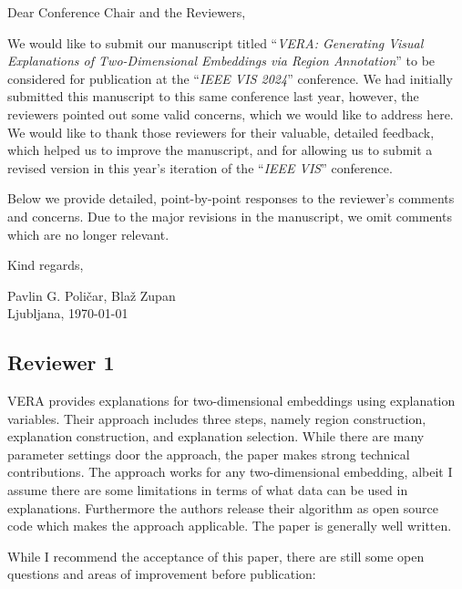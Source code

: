 \documentclass{article}
\newcommand{\review}[1]{\begin{leftbar}\noindent #1\end{leftbar}}
\newlength{\leftbarwidth}
\newlength{\leftbarsep}
\renewenvironment{leftbar}{%
    \def\FrameCommand{{\color{black}{\vrule width \leftbarwidth\relax\hspace {\leftbarsep}}}}%
    \MakeFramed {\advance \hsize -\width \FrameRestore }%
}{\endMakeFramed}
\begin{document}

\vspace{5mm}

\vspace{5mm}


\noindent Dear Conference Chair and the Reviewers, \\
 
\vspace{3mm}

\noindent We would like to submit our manuscript titled ``\textit{VERA: Generating Visual Explanations of Two-Dimensional Embeddings via Region Annotation}'' to be considered for publication at the ``\textit{IEEE VIS 2024}'' conference.
We had initially submitted this manuscript to this same conference last year, however, the reviewers pointed out some valid concerns, which we would like to address here. We would like to thank those reviewers for their valuable, detailed feedback, which helped us to improve the manuscript, and for allowing us to submit a revised version in this year's iteration of the ``\textit{IEEE VIS}'' conference.

Below we provide detailed, point-by-point responses to the reviewer's comments and concerns. Due to the major revisions in the manuscript, we omit comments which are no longer relevant.

\vspace{3mm}

\noindent Kind regards,
\vspace{3mm}

\noindent Pavlin G. Poli\v{c}ar,
Bla\v{z} Zupan \\ 
\noindent Ljubljana, \today

\vspace{10mm}


\subsection*{Reviewer 1}

\review{VERA provides explanations for two-dimensional embeddings using explanation
variables. Their approach includes three steps, namely region construction,
explanation construction, and explanation selection. While there are many
parameter settings door the approach, the paper makes strong technical
contributions. The approach works for any two-dimensional embedding, albeit I
assume there are some limitations in terms of what data can be used in
explanations. Furthermore the authors release their algorithm as open source code
which makes the approach applicable. The paper is generally well written.

While I recommend the acceptance of this paper, there are still some open
questions and areas of improvement before publication:}
\end{document}
